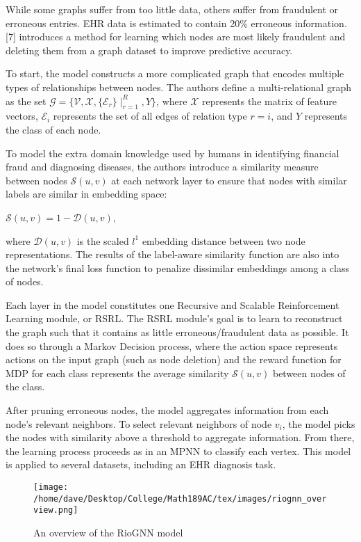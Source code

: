 \documentclass{article}
\begin{document}
While some graphs suffer from too little data, others suffer from fraudulent or erroneous entries. EHR data is estimated to contain 20\% erroneous information. 
[7] introduces a method for learning which nodes are most likely fraudulent and deleting them from a graph dataset to improve predictive accuracy. 

To start, the model constructs a more complicated graph that encodes multiple types of relationships between nodes. The authors define a multi-relational graph as the set $\mathcal{G} = \{\mathcal{V},\mathcal{X},\{\mathcal{E}_r\} \mid_{r=1}^R,Y\}$, where $\mathcal{X}$ represents the matrix of feature vectors, $\mathcal{E}_i$ represents the set of all edges of relation type $r = i$, and $Y$ represents the class of each node. 

To model the extra domain knowledge used by humans in identifying financial fraud and diagnosing diseases, the authors introduce a similarity measure between nodes $\mathcal{S}(u,v)$ at each network layer to ensure that nodes with similar labels are similar in embedding space:

\begin{center}
$\mathcal{S}(u,v) = 1 - \mathcal{D}(u,v)$,
\end{center}

where $\mathcal{D}(u,v)$ is the scaled $l^1$ embedding distance between two node representations. The results of the label-aware similarity function are also into the network's final loss function to penalize dissimilar embeddings among a class of nodes. 

Each layer in the model constitutes one Recursive and Scalable Reinforcement Learning module, or RSRL. The RSRL module's goal is to learn to reconstruct the graph such that it contains as little erroneous/fraudulent data as possible. It does so through a Markov Decision process, where the action space represents actions on the input graph (such as node deletion) and the reward function for MDP for each class represents the average similarity $\mathcal{S}(u,v)$ between nodes of the class.

After pruning erroneous nodes, the model aggregates information from each node's relevant neighbors. To select relevant neighbors of node $v_i$, the model picks the nodes with similarity above a threshold to aggregate information. From there, the learning process proceeds as in an MPNN to classify each vertex. This model is applied to several datasets, including an EHR diagnosis task. 

\begin{figure} [htbp!]
\centering
	\caption{An overview of the RioGNN model}
        \texttt{[image: /home/dave/Desktop/College/Math189AC/tex/images/riognn\_overview.png]}
    \end{figure}
\end{document}
